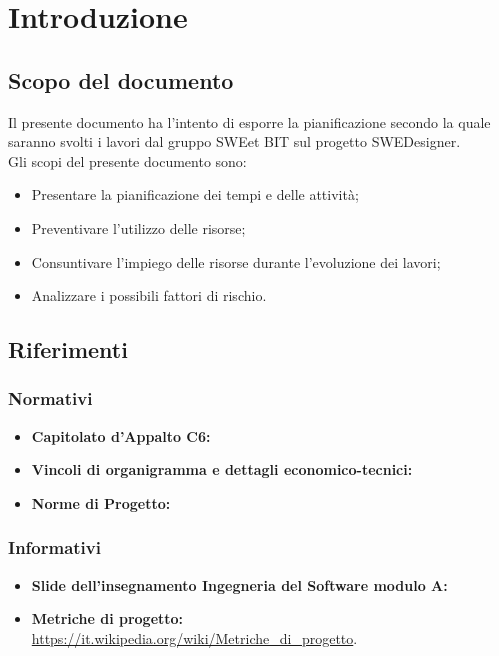 \section{Introduzione}
\subsection{Scopo del documento}
Il presente documento ha l'intento di esporre la pianificazione secondo la quale saranno svolti i lavori dal gruppo SWEet BIT sul progetto SWEDesigner. \\
Gli scopi del presente documento sono:
\begin{itemize}
	\item Presentare la pianificazione dei tempi e delle attività; \\
	\item Preventivare l'utilizzo delle risorse; \\
	\item Consuntivare l'impiego delle risorse durante l'evoluzione dei lavori; \\
	\item Analizzare i possibili fattori di rischio. \\
\end{itemize}
\subsection{Riferimenti}
\subsubsection{Normativi}
\begin{itemize}
	\item \textbf{Capitolato d'Appalto C6:} \\
	\item \textbf{Vincoli di organigramma e dettagli economico-tecnici:} \\
	\item \textbf{Norme di Progetto:} \\
\end{itemize}
\subsubsection{Informativi}
\begin{itemize}
	\item \textbf{Slide dell'insegnamento Ingegneria del Software modulo A:} \\
	\item \textbf{Metriche di progetto:} \\
		\url{https://it.wikipedia.org/wiki/Metriche_di_progetto}. \\
\end{itemize}
